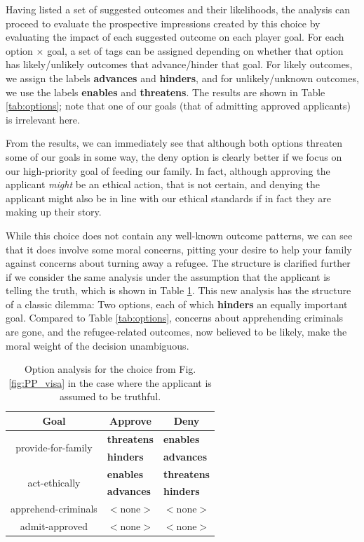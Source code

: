 \documentclass[arts,article,submit,moreauthors,pdftex,10pt,a4paper]{Definitions/mdpi}
\newcommand{\enables}{\textbf{\color{enables}enables}}
\newcommand{\advances}{\textbf{\color{advances}advances}}
\newcommand{\threatens}{\textbf{\color{threatens}threatens}}
\newcommand{\hinders}{\textbf{\color{hinders}hinders}}
\begin{document}
Having listed a set of suggested outcomes and their likelihoods, the analysis can proceed to evaluate the prospective impressions created by this choice by evaluating the impact of each suggested outcome on each player goal.
%
For each option $\times$ goal, a set of tags can be assigned depending on whether that option has likely/unlikely outcomes that advance/hinder that goal.
%
For likely outcomes, we assign the labels \advances{} and \hinders{}, and for unlikely/unknown outcomes, we use the labels \enables{} and \threatens{}.
%
The results are shown in Table \ref{tab:options}; note that one of our goals (that of admitting approved applicants) is irrelevant here.


From the results, we can immediately see that although both options threaten some of our goals in some way, the deny option is clearly better if we focus on our high-priority goal of feeding our family.
%
In fact, although approving the applicant \emph{might} be an ethical action, that is not certain, and denying the applicant might also be in line with our ethical standards if in fact they are making up their story.


While this choice does not contain any well-known outcome patterns, we can see that it does involve some moral concerns, pitting your desire to help your family against concerns about turning away a refugee.
%
The structure is clarified further if we consider the same analysis under the assumption that the applicant is telling the truth, which is shown in Table \ref{tab:trusting_options}.
%
This new analysis has the structure of a classic dilemma: Two options, each of which \hinders{} an equally important goal.
%
Compared to Table \ref{tab:options}, concerns about apprehending criminals are gone, and the refugee-related outcomes, now believed to be likely, make the moral weight of the decision unambiguous.

\begin{table}[H]
\centering
\begin{tabular}{c l l}
  \toprule
  \textbf{Goal} & \multicolumn{1}{c}{\textbf{Approve}} & \multicolumn{1}{c}{\textbf{Deny}} \\
  \midrule
  \multirow{2}{9em}{\centering provide-for-family} & \threatens{} & \enables{} \\
                                                   & \hinders{}   & \advances{} \\
  \midrule
  \multirow{2}{9em}{\centering act-ethically} & \enables{}  & \threatens{} \\
                                              & \advances{} & \hinders{} \\
  \midrule
  apprehend-criminals & $<$none$>$ & $<$none$>$ \\
  \midrule
  admit-approved & $<$none$>$ & $<$none$>$ \\
  \bottomrule
\end{tabular}
\caption[Alternate option analysis]{Option analysis for the choice from Fig. \ref{fig:PP_visa} in the case where the applicant is assumed to be truthful.}
\label{tab:trusting_options}
\end{table}
\end{document}
